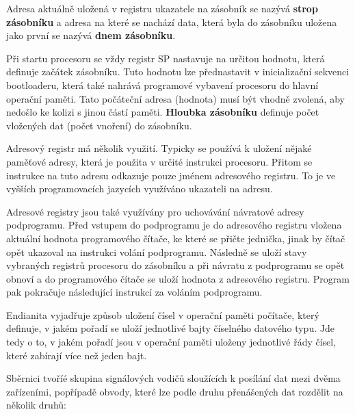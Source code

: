 Adresa aktuálně uložená v registru ukazatele na zásobník se nazývá {\bf strop zásobníku} a adresa na které se nachází data, která byla do zásobníku uložena jako první se nazývá {\bf dnem zásobníku}. 

Při startu procesoru se vždy registr SP nastavuje na určitou hodnotu, která definuje začátek zásobníku. Tuto hodnotu lze přednastavit v inicializační sekvenci bootloaderu, která také nahrává programové vybavení procesoru do hlavní operační paměti. Tato počáteční adresa (hodnota) musí být vhodně zvolená, aby nedošlo ke kolizi s jinou částí paměti. {\bf Hloubka zásobníku} definuje počet vložených dat (počet vnoření) do zásobníku.


Adresový registr má několik využití. Typicky se používá k uložení nějaké paměťové adresy, která je použita v určité instrukci procesoru. Přitom se instrukce na tuto adresu odkazuje pouze jménem adresového registru. To je ve vyšších programovacích jazycích využíváno ukazateli na adresu. 

Adresové registry jsou také využívány pro uchovávání návratové adresy podprogramu. Před vstupem do podprogramu je do adresového registru vložena aktuální hodnota programového čítače, ke které se přičte jednička, jinak by čítač opět ukazoval na instrukci volání podprogramu. Následně se uloží stavy vybraných registrů procesoru do zásobníku a při návratu z podprogramu se opět obnoví a do programového čítače se uloží hodnota z adresového registru. Program pak pokračuje následující instrukcí za voláním podprogramu. 








Endianita vyjadřuje způsob uložení čísel v operační paměti počítače, který definuje, v jakém pořadí se uloží jednotlivé bajty číselného datového typu. Jde tedy o to, v jakém pořadí jsou v operační paměti uloženy jednotlivé řády čísel, které zabírají více než jeden bajt.



Sběrnici tvoříé skupina signálových vodičů sloužících k posílání dat mezi dvěma zařízeními, popřípadě obvody, které lze podle druhu přenášených dat rozdělit na několik druhů:

